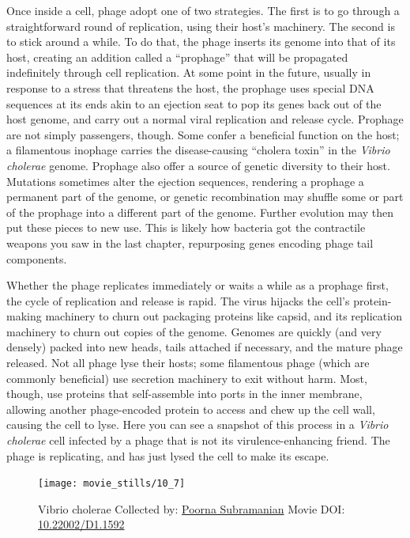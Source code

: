 \documentclass[]{tufte-book}
\begin{document}
Once inside a cell, phage adopt one of two strategies. The first is to
go through a straightforward round of replication, using their host's
machinery. The second is to stick around a while. To do that, the phage
inserts its genome into that of its host, creating an addition called a
``prophage'' that will be propagated indefinitely through cell
replication. At some point in the future, usually in response to a
stress that threatens the host, the prophage uses special DNA sequences
at its ends akin to an ejection seat to pop its genes back out of the
host genome, and carry out a normal viral replication and release cycle.
Prophage are not simply passengers, though. Some confer a beneficial
function on the host; a filamentous inophage carries the disease-causing
``cholera toxin'' in the \emph{Vibrio cholerae} genome. Prophage also
offer a source of genetic diversity to their host. Mutations sometimes
alter the ejection sequences, rendering a prophage a permanent part of
the genome, or genetic recombination may shuffle some or part of the
prophage into a different part of the genome. Further evolution may then
put these pieces to new use. This is likely how bacteria got the
contractile weapons you saw in the last chapter, repurposing genes
encoding phage tail components.

Whether the phage replicates immediately or waits a while as a prophage
first, the cycle of replication and release is rapid. The virus hijacks
the cell's protein-making machinery to churn out packaging proteins like
capsid, and its replication machinery to churn out copies of the genome.
Genomes are quickly (and very densely) packed into new heads, tails
attached if necessary, and the mature phage released. Not all phage lyse
their hosts; some filamentous phage (which are commonly beneficial) use
secretion machinery to exit without harm. Most, though, use proteins
that self-assemble into ports in the inner membrane, allowing another
phage-encoded protein to access and chew up the cell wall, causing the
cell to lyse. Here you can see a snapshot of this process in a
\emph{Vibrio cholerae} cell infected by a phage that is not its
virulence-enhancing friend. The phage is replicating, and has just lysed
the cell to make its escape.





\begin{figure}
\texttt{[image: movie\_stills/10\_7]} \caption[Vibrio cholerae Collected by:
\protect\hyperlink{poorna_subramanian}{Poorna Subramanian} Movie DOI:
\href{https://doi.org/10.22002/D1.1592}{10.22002/D1.1592}]{Vibrio cholerae Collected by:
\protect\hyperlink{poorna_subramanian}{Poorna Subramanian} Movie DOI:
\href{https://doi.org/10.22002/D1.1592}{10.22002/D1.1592}}\label{fig:10-7}
\end{figure}
\end{document}
